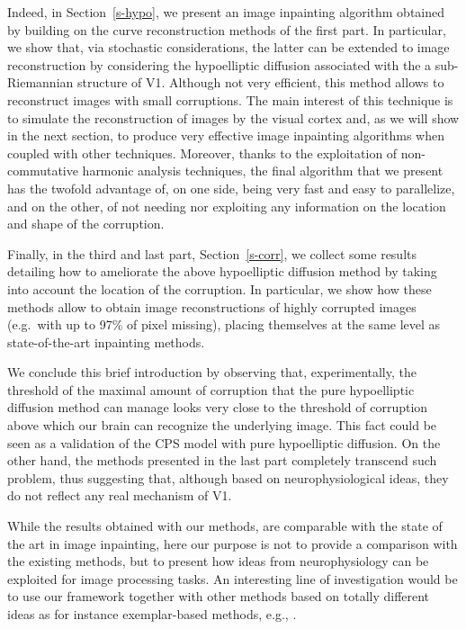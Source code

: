 \documentclass[proc]{edpsmath}
\begin{document}
Indeed, in Section~\ref{s-hypo}, we present an image inpainting algorithm obtained by building on the curve reconstruction methods of the first part. In particular, we show that, via stochastic considerations, the latter can be extended to image reconstruction by considering the hypoelliptic diffusion associated with the a sub-Riemannian structure of V1. Although not very efficient, this method allows to reconstruct images with small corruptions. The main interest of this technique is to simulate the reconstruction of images by the visual cortex and, as we will show in the next section, to produce very effective image inpainting algorithms when coupled with other techniques. Moreover, thanks to the exploitation of non-commutative harmonic analysis techniques, the final algorithm that we present has the twofold advantage of, on one side, being very fast and easy to parallelize, and on the other, of not needing nor exploiting any information on the location and shape of the corruption.

Finally, in the third and last part, Section~\ref{s-corr}, we collect some results detailing how to ameliorate the above hypoelliptic diffusion method by taking into account the location of the corruption. In particular, we show how these methods allow to obtain image reconstructions of highly corrupted images (e.g.\ with up to 97\% of pixel missing), placing themselves at the same level as state-of-the-art inpainting methods.

We conclude this brief introduction by observing that, experimentally, the threshold of the maximal amount of corruption that the pure hypoelliptic diffusion method can manage looks very close to the threshold of corruption above which our brain can recognize the underlying image. This fact could be seen as a validation of the CPS model with pure hypoelliptic diffusion. On the other hand, the methods presented in the last part completely transcend such problem, thus suggesting that, although based on neurophysiological ideas, they do not reflect any real mechanism of V1.

While the results obtained with our methods, are comparable with the state of the art in image inpainting, here our purpose is not to provide a comparison with the existing methods, but to present how ideas from neurophysiology can be exploited for image processing tasks. An interesting line of investigation would be to use our framework together with other methods based on totally different ideas as for instance exemplar-based methods, e.g., \cite{Bredies13,Facciolo}.
\end{document}
